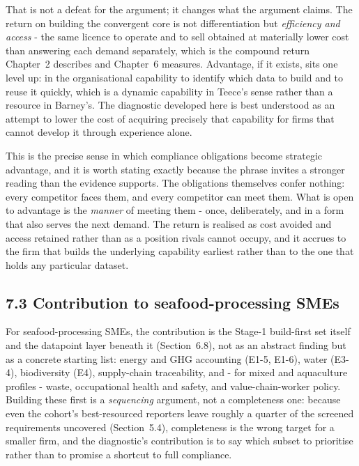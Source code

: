 \documentclass[
]{article}
\begin{document}
That is not a defeat for the argument; it changes what the argument claims. The
return on building the convergent core is not differentiation but \emph{efficiency
and access} - the same licence to operate and to sell obtained at materially lower
cost than answering each demand separately, which is the compound return Chapter~2
describes and Chapter~6 measures. Advantage, if it exists, sits one level up: in
the organisational capability to identify which data to build and to reuse it
quickly, which is a dynamic capability in Teece's sense rather than a resource in
Barney's. The diagnostic developed here is best understood as an attempt to lower
the cost of acquiring precisely that capability for firms that cannot develop it
through experience alone.

This is the precise sense in which compliance obligations become strategic
advantage, and it is worth stating exactly because the phrase invites a stronger
reading than the evidence supports. The obligations themselves confer nothing:
every competitor faces them, and every competitor can meet them. What is open to
advantage is the \emph{manner} of meeting them - once, deliberately, and in a form
that also serves the next demand. The return is realised as cost avoided and
access retained rather than as a position rivals cannot occupy, and it accrues to
the firm that builds the underlying capability earliest rather than to the one
that holds any particular dataset.

\subsection{7.3 Contribution to seafood-processing
SMEs}\label{discussion-sme-contribution}

For seafood-processing SMEs, the contribution is the Stage-1 build-first set
itself and the datapoint layer beneath it (Section~6.8), not as an abstract
finding but as a concrete starting list: energy and GHG accounting (E1-5,
E1-6), water (E3-4), biodiversity (E4), supply-chain traceability, and - for
mixed and aquaculture profiles - waste, occupational health and safety, and
value-chain-worker policy.
Building these first is a \emph{sequencing} argument, not a completeness one:
because even the cohort's best-resourced reporters leave roughly a quarter of
the screened requirements uncovered (Section~5.4), completeness is the wrong
target for a smaller firm, and the diagnostic's contribution is to say which
subset to prioritise rather than to promise a shortcut to full compliance.
\end{document}
